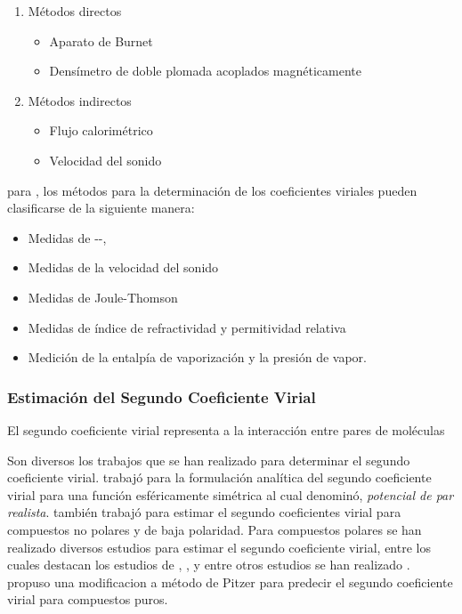     \begin{enumerate}[label=(\alph*)]
      \item Métodos directos
        \begin{itemize}
          \item Aparato de Burnet
          \item Densímetro de doble plomada acoplados magnéticamente
        \end{itemize}
      \item  Métodos indirectos
        \begin{itemize}
          \item Flujo calorimétrico
          \item Velocidad del sonido
        \end{itemize}
    \end{enumerate}

    para \parencite{Dymond2002}, los métodos para la determinación de los coeficientes viriales pueden clasificarse de la siguiente manera:

    \begin{itemize}
      \item Medidas de {\pressure-\Vmolar-\temperatureAbsolute},
      \item Medidas de la velocidad del sonido
      \item Medidas de Joule-Thomson
      \item Medidas de índice de refractividad y permitividad relativa
      \item Medición de la entalpía de vaporización y la presión de vapor. 
    \end{itemize}

\subsubsection{Estimación del Segundo Coeficiente Virial}
  
    El segundo coeficiente virial representa a la interacción entre pares de moléculas

Son diversos los trabajos que se han realizado para determinar el segundo coeficiente virial. \autocite[postnote]{woolley1969second} trabajó para la formulación analítica del segundo coeficiente virial para una función esféricamente simétrica al cual denominó, \textit{potencial de par realista}. \parencite{pitzer1990second} también trabajó para estimar el segundo coeficientes virial para compuestos no polares y de baja polaridad. Para compuestos polares se han realizado diversos estudios para estimar el segundo coeficiente virial, entre los cuales destacan los estudios de \parencite{maris1985interaction}, \parencite{tarakad1977improved}, y entre otros estudios se han realizado . \parencite{vetere2007simple} propuso una modificacion a método de Pitzer para predecir el segundo coeficiente virial para compuestos puros.


